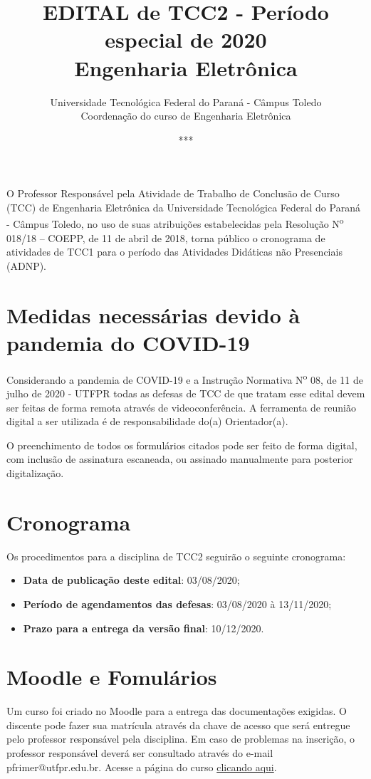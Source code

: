 \documentclass[a4paper, 12pt]{article}
\title{EDITAL de TCC2 - Período especial de 2020\\\textbf{Engenharia Eletrônica}}
\date{***}
\author{Universidade Tecnológica Federal do Paraná - Câmpus Toledo\\Coordenação do curso de Engenharia Eletrônica}
\newcommand{\utf}{Universidade Tecnológica Federal do Paraná - Câmpus Toledo}
\newcommand{\tcc}{Trabalho de Conclusão de Curso}
\begin{document}
    \maketitle
    
    O Professor Responsável pela Atividade de \tcc{ } (TCC) de Engenharia Eletrônica da \utf, no uso de suas atribuições estabelecidas pela Resolução N\textsuperscript{o} 018/18 – COEPP, de 11 de abril de 2018, torna público o cronograma de atividades de TCC1 para o período das Atividades Didáticas não Presenciais (ADNP).

    \section{Medidas necessárias devido à pandemia do COVID-19}

    Considerando a pandemia de COVID-19 e a Instrução Normativa N\textsuperscript{o} 08, de 11 de julho de 2020 - UTFPR todas as defesas de TCC de que tratam esse edital devem ser feitas de forma remota através de videoconferência. A ferramenta de reunião digital a ser utilizada é de responsabilidade do(a) Orientador(a).
    
    O preenchimento de todos os formulários citados pode ser feito de forma digital, com inclusão de assinatura escaneada, ou assinado manualmente para posterior digitalização.

    \section{Cronograma}
    \label{sec:CRO}
    
    Os procedimentos para a disciplina de TCC2 seguirão o seguinte cronograma:
    \begin{itemize}
    	\item \textbf{Data de publicação deste edital}: 03/08/2020;
    	\item \textbf{Período de agendamentos das defesas}: 03/08/2020 à 13/11/2020;
    	\item \textbf{Prazo para a entrega da versão final}: 10/12/2020.
    \end{itemize}
    
    \section{Moodle e Fomulários}
    
    Um curso foi criado no Moodle para a entrega das documentações exigidas. O discente pode fazer sua matrícula através da chave de acesso que será entregue pelo professor responsável pela disciplina. Em caso de problemas na inscrição, o professor responsável deverá ser consultado através do e-mail pfrimer@utfpr.edu.br. Acesse a página do curso \href{https://moodle.td.utfpr.edu.br/course/view.php?id=650}{clicando aqui}.
    
\end{document}
